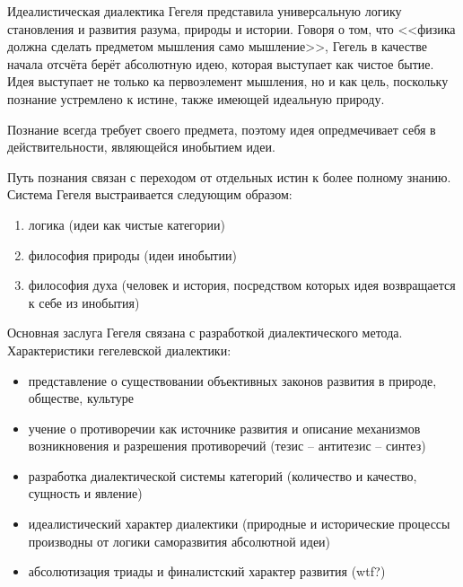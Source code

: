 Идеалистическая диалектика Гегеля представила универсальную логику становления и развития разума, природы и истории. Говоря о том, что <<физика должна сделать предметом мышления само мышление>>, Гегель в качестве начала отсчёта берёт абсолютную идею, которая выступает как чистое бытие. Идея выступает не только ка первоэлемент мышления, но и как цель, поскольку познание устремлено к истине, также имеющей идеальную природу.

Познание всегда требует своего предмета, поэтому идея опредмечивает себя в действительности, являющейся инобытием идеи.

Путь познания связан с переходом от отдельных истин к более полному знанию. Система Гегеля выстраивается следующим образом:
\begin{enumerate}
     \item логика (идеи как чистые категории)
     \item философия природы (идеи инобытии)
     \item философия духа (человек и история, посредством которых идея возвращается к себе из инобытия)
 \end{enumerate}

 Основная заслуга Гегеля связана с разработкой диалектического метода. Характеристики гегелевской диалектики:
 \begin{itemize}
     \item представление о существовании объективных законов развития в природе, обществе, культуре
     \item учение о противоречии как источнике развития и описание механизмов возникновения и разрешения противоречий (тезис -- антитезис -- синтез)
     \item разработка диалектической системы категорий (количество и качество, сущность и явление)
     \item идеалистический характер диалектики (природные и исторические процессы производны от логики саморазвития абсолютной идеи)
     \item абсолютизация триады и финалистский характер развития (wtf?)
 \end{itemize}